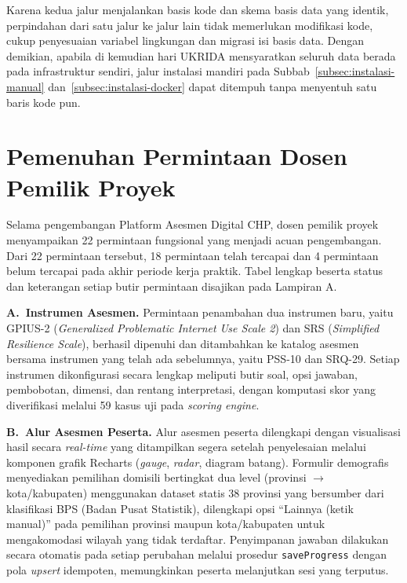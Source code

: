 Karena kedua jalur menjalankan basis kode dan skema basis data yang identik, perpindahan dari satu jalur ke jalur lain tidak memerlukan modifikasi kode, cukup penyesuaian variabel lingkungan dan migrasi isi basis data. Dengan demikian, apabila di kemudian hari UKRIDA mensyaratkan seluruh data berada pada infrastruktur sendiri, jalur instalasi mandiri pada Subbab~\ref{subsec:instalasi-manual} dan~\ref{subsec:instalasi-docker} dapat ditempuh tanpa menyentuh satu baris kode pun.

\section{Pemenuhan Permintaan Dosen Pemilik Proyek}
\label{sec:pemenuhan-permintaan}

Selama pengembangan Platform Asesmen Digital CHP, dosen pemilik proyek menyampaikan 22 permintaan fungsional yang menjadi acuan pengembangan. Dari 22 permintaan tersebut, 18 permintaan telah tercapai dan 4 permintaan belum tercapai pada akhir periode kerja praktik. Tabel lengkap beserta status dan keterangan setiap butir permintaan disajikan pada Lampiran A.

\textbf{A.~Instrumen Asesmen.}
Permintaan penambahan dua instrumen baru, yaitu GPIUS-2 (\textit{Generalized Problematic Internet Use Scale 2}) dan SRS (\textit{Simplified Resilience Scale}), berhasil dipenuhi dan ditambahkan ke katalog asesmen bersama instrumen yang telah ada sebelumnya, yaitu PSS-10 dan SRQ-29. Setiap instrumen dikonfigurasi secara lengkap meliputi butir soal, opsi jawaban, pembobotan, dimensi, dan rentang interpretasi, dengan komputasi skor yang diverifikasi melalui 59 kasus uji pada \textit{scoring engine}.

\textbf{B.~Alur Asesmen Peserta.}
Alur asesmen peserta dilengkapi dengan visualisasi hasil secara \textit{real-time} yang ditampilkan segera setelah penyelesaian melalui komponen grafik Recharts (\textit{gauge}, \textit{radar}, diagram batang). Formulir demografis menyediakan pemilihan domisili bertingkat dua level (provinsi $\rightarrow$ kota/kabupaten) menggunakan dataset statis 38 provinsi yang bersumber dari klasifikasi BPS (Badan Pusat Statistik), dilengkapi opsi ``Lainnya (ketik manual)'' pada pemilihan provinsi maupun kota/kabupaten untuk mengakomodasi wilayah yang tidak terdaftar. Penyimpanan jawaban dilakukan secara otomatis pada setiap perubahan melalui prosedur \texttt{saveProgress} dengan pola \textit{upsert} idempoten, memungkinkan peserta melanjutkan sesi yang terputus.

